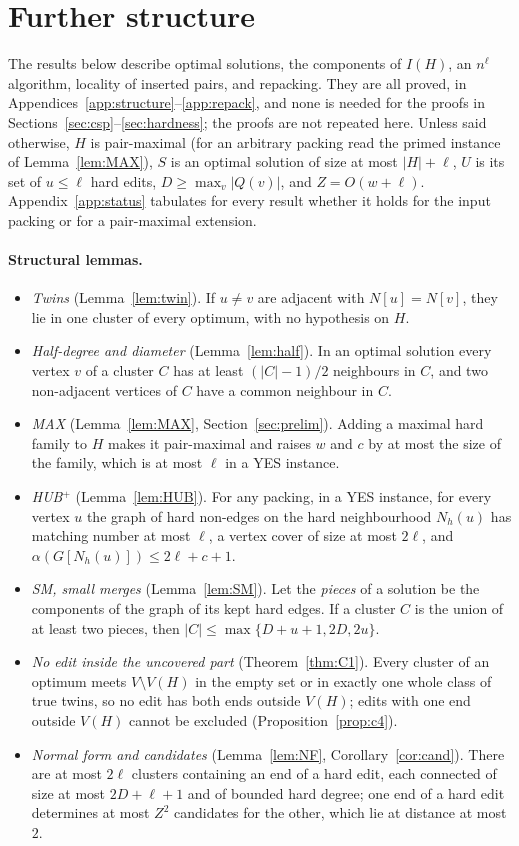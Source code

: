 \section{Further structure}\label{sec:further}
The results below describe optimal solutions, the components of $I(H)$, an $n^{\ell}$ algorithm, locality of inserted pairs, and repacking. They are all proved, in Appendices~\ref{app:structure}--\ref{app:repack}, and none is needed for the proofs in Sections~\ref{sec:csp}--\ref{sec:hardness}; the proofs are not repeated here. Unless said otherwise, $H$ is pair-maximal (for an arbitrary packing read the primed instance of Lemma~\ref{lem:MAX}), $S$ is an optimal solution of size at most $|H|+\ell$, $U$ is its set of $u\le\ell$ hard edits, $D\ge\max_v|Q(v)|$, and $Z=O(w+\ell)$. Appendix~\ref{app:status} tabulates for every result whether it holds for the input packing or for a pair-maximal extension.

\paragraph{Structural lemmas.}
\begin{itemize}
\item \emph{Twins} (Lemma~\ref{lem:twin}). If $u\ne v$ are adjacent with $N[u]=N[v]$, they lie in one cluster of every optimum, with no hypothesis on $H$.
\item \emph{Half-degree and diameter} (Lemma~\ref{lem:half}). In an optimal solution every vertex $v$ of a cluster $C$ has at least $(|C|-1)/2$ neighbours in $C$, and two non-adjacent vertices of $C$ have a common neighbour in $C$.
\item \emph{MAX} (Lemma~\ref{lem:MAX}, Section~\ref{sec:prelim}). Adding a maximal hard family to $H$ makes it pair-maximal and raises $w$ and $c$ by at most the size of the family, which is at most $\ell$ in a YES instance.
\item \emph{HUB$^+$} (Lemma~\ref{lem:HUB}). For any packing, in a YES instance, for every vertex $u$ the graph of hard non-edges on the hard neighbourhood $N_h(u)$ has matching number at most $\ell$, a vertex cover of size at most $2\ell$, and $\alpha(G[N_h(u)])\le2\ell+c+1$.
\item \emph{SM, small merges} (Lemma~\ref{lem:SM}). Let the \emph{pieces} of a solution be the components of the graph of its kept hard edges. If a cluster $C$ is the union of at least two pieces, then $|C|\le\max\{D+u+1,2D,2u\}$.
\item \emph{No edit inside the uncovered part} (Theorem~\ref{thm:C1}). Every cluster of an optimum meets $V\setminus V(H)$ in the empty set or in exactly one whole class of true twins, so no edit has both ends outside $V(H)$; edits with one end outside $V(H)$ cannot be excluded (Proposition~\ref{prop:c4}).
\item \emph{Normal form and candidates} (Lemma~\ref{lem:NF}, Corollary~\ref{cor:cand}). There are at most $2\ell$ clusters containing an end of a hard edit, each connected of size at most $2D+\ell+1$ and of bounded hard degree; one end of a hard edit determines at most $Z^2$ candidates for the other, which lie at distance at most $2$.
\end{itemize}

